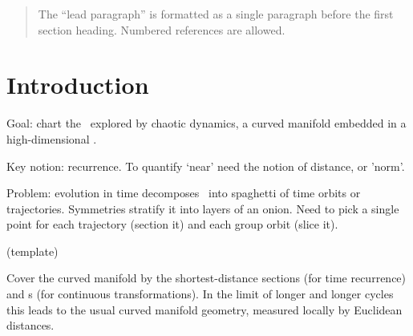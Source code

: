 
\begin{quotation}
    \ifdraft\color{blue}
The ``lead paragraph'' is formatted as a single paragraph before the first
section heading. Numbered references are allowed.
    \color{black}\fi
\end{quotation}


\section{Introduction}
\label{s:intro}

    \ifdraft\color{blue}
Goal: chart the \statesp\ explored by chaotic dynamics,
a curved manifold embedded in a high-dimensional \statesp.

Key notion: recurrence.
To quantify `near' need the notion of distance, or 'norm'.

Problem: evolution in time decomposes \statesp\ into spaghetti of time
orbits or trajectories. Symmetries stratify it into layers of an onion.
Need to pick a single point for each trajectory (section it) and each group orbit
(slice it).

(template)

Cover the curved manifold by the shortest-distance sections (for time
recurrence) and \slice s (for continuous transformations). In the limit of longer
and longer cycles this leads to the usual curved manifold geometry,
measured locally by Euclidean distances.
    \color{black}\fi


